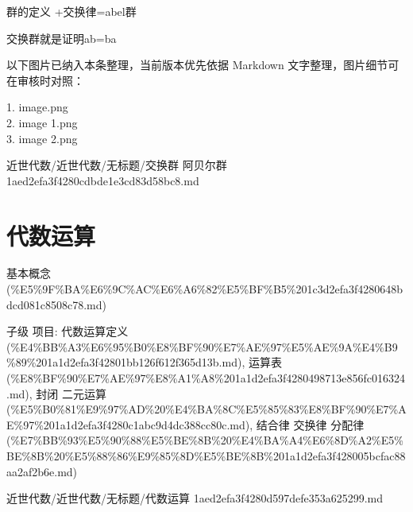 \begin{note}

群的定义 +交换律=abel群

交换群就是证明ab=ba

\end{note}

\begin{note}[关联图片]
以下图片已纳入本条整理，当前版本优先依据 Markdown 文字整理，图片细节可在审核时对照：

1. image.png\\
2. image 1.png\\
3. image 2.png\\

\end{note}

\begin{note}[来源路径]

近世代数/近世代数/无标题/交换群 阿贝尔群 1aed2efa3f4280cdbde1e3cd83d58bc8.md

\end{note}

\section*{代数运算}

\begin{note}[来源上级主题]

基本概念 (\%E5\%9F\%BA\%E6\%9C\%AC\%E6\%A6\%82\%E5\%BF\%B5\%201c3d2efa3f4280648bdcd081c8508c78.md)

\end{note}

\begin{note}[代数运算]

子级 项目: 代数运算定义 (\%E4\%BB\%A3\%E6\%95\%B0\%E8\%BF\%90\%E7\%AE\%97\%E5\%AE\%9A\%E4\%B9\%89\%201a1d2efa3f42801bb126f612f365d13b.md), 运算表 (\%E8\%BF\%90\%E7\%AE\%97\%E8\%A1\%A8\%201a1d2efa3f4280498713e856fc016324.md), 封闭 二元运算 (\%E5\%B0\%81\%E9\%97\%AD\%20\%E4\%BA\%8C\%E5\%85\%83\%E8\%BF\%90\%E7\%AE\%97\%201a1d2efa3f4280c1abc9d4dc388cc80c.md), 结合律 交换律 分配律 (\%E7\%BB\%93\%E5\%90\%88\%E5\%BE\%8B\%20\%E4\%BA\%A4\%E6\%8D\%A2\%E5\%BE\%8B\%20\%E5\%88\%86\%E9\%85\%8D\%E5\%BE\%8B\%201a1d2efa3f428005bcfac88aa2af2b6e.md)

\end{note}

\begin{note}[来源路径]

近世代数/近世代数/无标题/代数运算 1aed2efa3f4280d597defe353a625299.md

\end{note}

